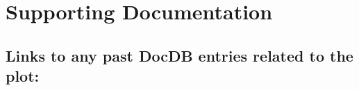 \section{Supporting Documentation}

\subsection{Links to any past DocDB entries related to the plot:} 
\hspace{2in}
%
{}


